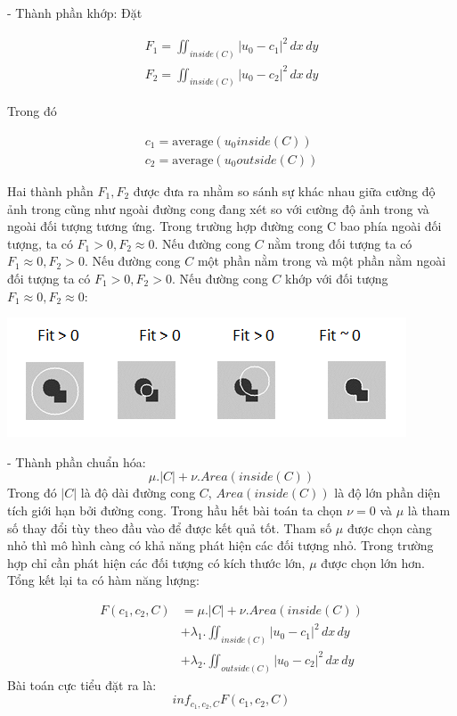 \documentclass[12pt, oneside, a4paper]{book}
\begin{document}
- Thành phần khớp: Đặt

\begin{center}
\begin{align*}
F_1=\iint_{inside(C)} |u_0-c_1|^2 \,dx\,dy\\
F_2=\iint_{inside(C)} |u_0-c_2|^2 \,dx\,dy
\end{align*}
\end{center}
Trong đó
\begin{center}
\begin{align*}
c_1=\text{average}(u_0 inside(C))\\
c_2=\text{average}(u_0 outside(C))
\end{align*}
\end{center} 
Hai thành phần $F_1, F_2$ được đưa ra nhằm so sánh sự khác nhau giữa cường độ ảnh trong cũng như ngoài đường cong đang xét so với cường độ ảnh trong và ngoài đối tượng tương ứng. Trong trường hợp đường cong C bao phía ngoài đối tượng, ta có $F_1>0, F_2\approx 0$. Nếu đường cong $C$ nằm trong đối tượng ta có $F_1 \approx0, F_2> 0$. Nếu đường cong $C$ một phần nằm trong và một phần nằm ngoài đối tượng ta có $F_1>0, F_2> 0$. Nếu đường cong $C$ khớp với đối tượng $F_1 \approx 0, F_2\approx 0$:
\begin{center}
\includegraphics[scale=1]{figure/fitting.png}
\end{center}
- Thành phần chuẩn hóa:
\begin{equation}
\mu .|C|+\nu .Area(inside(C))
\end{equation}
Trong đó $|C|$ là độ dài đường cong $C$, $Area(inside(C))$ là độ lớn phần diện tích giới hạn bởi đường cong. Trong hầu hết bài toán ta chọn $\nu=0$ và $\mu$ là tham số thay đổi tùy theo đầu vào để được kết quả tốt. Tham số $\mu $ được chọn càng nhỏ thì mô hình càng có khả năng phát hiện các đối tượng nhỏ. Trong trường hợp chỉ cần phát hiện các đối tượng có kích thước lớn, $\mu$ được chọn lớn hơn.\\
Tổng kết lại ta có hàm năng lượng: 

\begin{equation*}
\begin{split}
F(c_1, c_2, C)&=\mu .|C|+\nu .Area(inside(C)) \\ 
&+\lambda_1 .\iint_{inside(C)} |u_0-c_1|^2 \,dx\,dy\\
&+\lambda_2 .\iint_{outside(C)} |u_0-c_2|^2 \,dx\,dy
\end{split}
\end{equation*}
Bài toán cực tiểu đặt ra là:
\begin{equation}
inf_{c_1,c_2,C} F(c_1, c_2, C)
\end{equation}
 
\end{document}
